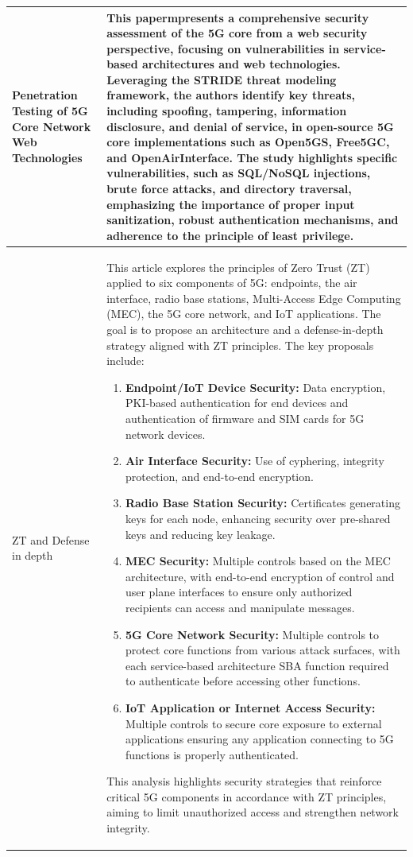 \documentclass{report}
\begin{document}
\begin{longtable}{|p{4cm}|p{12cm}|}
    Penetration Testing of 5G Core Network
    Web Technologies & This papermpresents a comprehensive security assessment of the 5G core from a web security perspective, focusing on vulnerabilities in service-based architectures and web technologies. Leveraging the STRIDE threat modeling framework, the authors identify key threats, including spoofing, tampering, information disclosure, and denial of service, in open-source 5G core implementations such as Open5GS, Free5GC, and OpenAirInterface.
    The study highlights specific vulnerabilities, such as SQL/NoSQL injections, brute force attacks, and directory traversal, emphasizing the importance of proper input sanitization, robust authentication mechanisms, and adherence to the principle of least privilege. \\
    \hline
    ZT and Defense in depth & 
    \parbox[t]{12cm}{
    This article explores the principles of Zero Trust (ZT) applied to six components of 5G: endpoints, the air interface, radio base stations, Multi-Access Edge Computing (MEC), the 5G core network, and IoT applications. The goal is to propose an architecture and a defense-in-depth strategy aligned with ZT principles. The key proposals include:
    \begin{enumerate}
        \item \textbf{Endpoint/IoT Device Security:} Data encryption, PKI-based authentication for end devices and authentication of firmware and SIM cards for 5G network devices.
        \item \textbf{Air Interface Security:} Use of cyphering, integrity protection, and end-to-end encryption.  
        \item \textbf{Radio Base Station Security:} Certificates generating keys for each node, enhancing security over pre-shared keys and reducing key leakage.  
        \item \textbf{MEC Security:} Multiple controls based on the MEC architecture, with end-to-end encryption of control and user plane interfaces to ensure only authorized recipients can access and manipulate messages.  
        \item \textbf{5G Core Network Security:} Multiple controls to protect core functions from various attack surfaces, with each service-based architecture SBA function required to authenticate before accessing other functions.  
        \item \textbf{IoT Application or Internet Access Security:} Multiple controls to secure core exposure to external applications ensuring any application connecting to 5G functions is properly authenticated.  
    \end{enumerate}
    This analysis highlights security strategies that reinforce critical 5G components in accordance with ZT principles, aiming to limit unauthorized access and strengthen network integrity.
    } \\
    \hline


\end{longtable}
\end{document}
